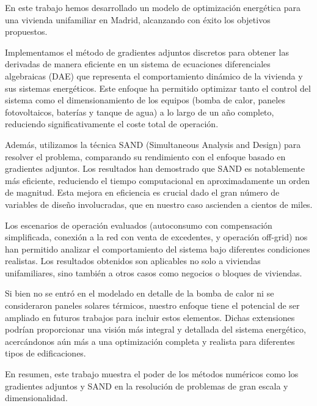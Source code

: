 En este trabajo hemos desarrollado un modelo de optimización energética para
una vivienda unifamiliar en Madrid, alcanzando con éxito los objetivos
propuestos.

Implementamos el método de gradientes adjuntos discretos para obtener las
derivadas de manera eficiente en un sistema de ecuaciones diferenciales
algebraicas (DAE) que representa el comportamiento dinámico de la vivienda y
sus sistemas energéticos. Este enfoque ha permitido optimizar tanto el control
del sistema como el dimensionamiento de los equipos (bomba de calor, paneles
fotovoltaicos, baterías y tanque de agua) a lo largo de un año completo,
reduciendo significativamente el coste total de operación.

Además, utilizamos la técnica SAND (Simultaneous Analysis and Design) para
resolver el problema, comparando su rendimiento con el enfoque basado en
gradientes adjuntos. Los resultados han demostrado que SAND es notablemente más
eficiente, reduciendo el tiempo computacional en aproximadamente un orden de
magnitud. Esta mejora en eficiencia es crucial dado el gran número de variables
de diseño involucradas, que en nuestro caso ascienden a cientos de miles.

Los escenarios de operación evaluados (autoconsumo con compensación
simplificada, conexión a la red con venta de excedentes, y operación off-grid)
nos han permitido analizar el comportamiento del sistema bajo diferentes
condiciones realistas. Los resultados obtenidos son aplicables no solo a
viviendas unifamiliares, sino también a otros casos como negocios o bloques de
viviendas.

Si bien no se entró en el modelado en detalle de la bomba de calor ni se
consideraron paneles solares térmicos, nuestro enfoque tiene el potencial de
ser ampliado en futuros trabajos para incluir estos elementos. Dichas
extensiones podrían proporcionar una visión más integral y detallada del
sistema energético, acercándonos aún más a una optimización completa y realista
para diferentes tipos de edificaciones.

En resumen, este trabajo muestra el poder de los métodos numéricos como los
gradientes adjuntos y SAND en la resolución de problemas de gran escala y
dimensionalidad.
